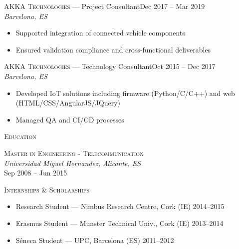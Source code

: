 \documentclass[11pt, a4paper]{article}
\newcommand{\headright}[1]{\vspace*{2ex}\textsc{\large\color{cvblue}#1}\par%
  \vspace*{-1.4ex}{\color{cvblue}\hrulefill}\par}
\newlength{\SideBarW}
\newlength{\BetweenJobsGap}
\newenvironment{job}[4]{%
  \vspace{\BetweenJobsGap}%
  \noindent\textsc{#1} --- #2\hfill {\small #4}\\%
  {\small\itshape #3}\par
  \begin{itemize}[leftmargin=1.4em,label=--,labelsep=0.5em,itemsep=0.45ex,topsep=0.2ex]
}{%
  \end{itemize}%
}
\begin{document}
\begin{minipage}[t]{\dimexpr\textwidth-\SideBarW-3mm\relax}
  \begin{job}{AKKA Technologies}{Project Consultant}{Barcelona, ES}{Dec 2017 -- Mar 2019}
    \item Supported integration of connected vehicle components
    \item Ensured validation compliance and cross-functional deliverables
  \end{job}

  \begin{job}{AKKA Technologies}{Technology Consultant}{Barcelona, ES}{Oct 2015 -- Dec 2017}
    \item Developed IoT solutions including firmware (Python/C/C++) and web (HTML/CSS/AngularJS/JQuery)
    \item Managed QA and CI/CD processes
  \end{job}

  \headright{Education}
  \noindent\textsc{Master in Engineering - Telecommunication} \\
  \textit{Universidad Miguel Hernandez, Alicante, ES} \\
  Sep 2008 -- Jun 2015

  \headright{Internships \& Scholarships}
  \begin{itemize}[leftmargin=1.4em,label=--,labelsep=0.5em,itemsep=0.45ex,topsep=0.2ex]
    \item Research Student --- Nimbus Research Centre, Cork (IE) \hfill 2014--2015
    \item Erasmus Student --- Munster Technical Univ., Cork (IE) \hfill 2013--2014
    \item Séneca Student --- UPC, Barcelona (ES) \hfill 2011--2012
  \end{itemize}
\end{minipage}
\end{document}
